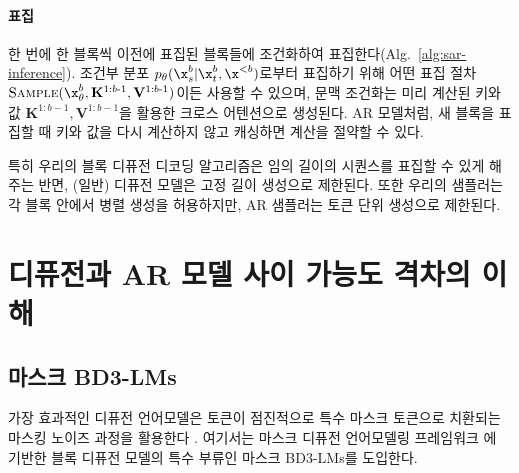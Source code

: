 \documentclass{article} %
\def\algofull{Block Discrete Denoising Diffusion Language Models}
\def\algos{BD3-LMs}
\begin{document}


\paragraph{표집} 한 번에 한 블록씩 이전에 표집된 블록들에 조건화하여 표집한다(Alg.~\ref{alg:sar-inference}). 조건부 분포 $p_\theta(\x_{s}^b | \x_{t}^b, \x^{<b})$로부터 표집하기 위해 어떤 표집 절차 $ \textsc{Sample}(\x_\theta^b, \mathbf{K}^{1:b\text{-}1},\mathbf{V}^{1:b\text{-}1})$이든 사용할 수 있으며, 문맥 조건화는 미리 계산된 키와 값 $\mathbf{K}^{1:b-1}, \mathbf{V}^{1:b-1}$을 활용한 크로스 어텐션으로 생성된다. AR 모델처럼, 새 블록을 표집할 때 키와 값을 다시 계산하지 않고 캐싱하면 계산을 절약할 수 있다.

특히 우리의 블록 디퓨전 디코딩 알고리즘은 임의 길이의 시퀀스를 표집할 수 있게 해 주는 반면, (일반) 디퓨전 모델은 고정 길이 생성으로 제한된다. 또한 우리의 샘플러는 각 블록 안에서 병렬 생성을 허용하지만, AR 샘플러는 토큰 단위 생성으로 제한된다.




\section{디퓨전과 AR 모델 사이 가능도 격차의 이해}

\subsection{마스크 \algos{}}

가장 효과적인 디퓨전 언어모델은 토큰이 점진적으로 특수 마스크 토큰으로 치환되는 마스킹 노이즈 과정을 활용한다 \citep{austin2021structured,lou2024discrete,sahoo2024simple}. 여기서는 마스크 디퓨전 언어모델링 프레임워크 \citep{sahoo2024simple, shi2024simplified, ou2025your}에 기반한 블록 디퓨전 모델의 특수 부류인 마스크 \algos{}를 도입한다.
\end{document}
